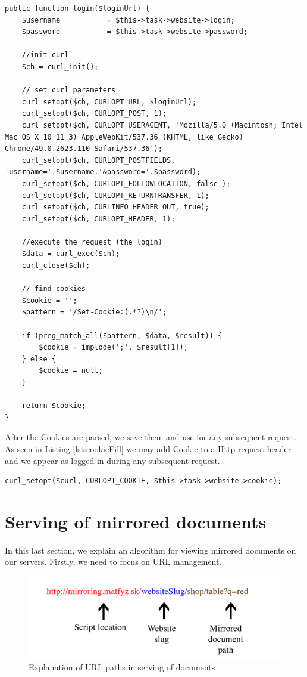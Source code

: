 \begin{lstlisting}[caption={Retrieving of a Cookie with Curl library},label={lst:login}]
public function login($loginUrl) {
    $username           = $this->task->website->login;
    $password           = $this->task->website->password;

    //init curl
    $ch = curl_init();
	
	// set curl parameters
    curl_setopt($ch, CURLOPT_URL, $loginUrl);
    curl_setopt($ch, CURLOPT_POST, 1);
    curl_setopt($ch, CURLOPT_USERAGENT, 'Mozilla/5.0 (Macintosh; Intel Mac OS X 10_11_3) AppleWebKit/537.36 (KHTML, like Gecko) Chrome/49.0.2623.110 Safari/537.36');
    curl_setopt($ch, CURLOPT_POSTFIELDS, 'username='.$username.'&password='.$password);
    curl_setopt($ch, CURLOPT_FOLLOWLOCATION, false );
    curl_setopt($ch, CURLOPT_RETURNTRANSFER, 1);
    curl_setopt($ch, CURLINFO_HEADER_OUT, true);
    curl_setopt($ch, CURLOPT_HEADER, 1);

    //execute the request (the login)
    $data = curl_exec($ch);
    curl_close($ch);

    // find cookies
    $cookie = '';
    $pattern = '/Set-Cookie:(.*?)\n/';

    if (preg_match_all($pattern, $data, $result)) {
        $cookie = implode(';', $result[1]);
    } else {
        $cookie = null;
    }

    return $cookie;
}
\end{lstlisting}

After the Cookies are parsed, we save them and use for any subsequent request. As seen in Listing \ref{lst:cookieFill} we may add Cookie to a Http request header and we appear as logged in during any subsequent request.

\begin{lstlisting}[caption={Adding Cookie to HTTP header using Curl},label={lst:cookieFill}]
curl_setopt($curl, CURLOPT_COOKIE, $this->task->website->cookie);
\end{lstlisting}

\section{Serving of mirrored documents}
\label{sec:serving}
In this last section, we explain an algorithm for viewing mirrored documents on our servers. Firstly, we need to focus on URL management.

\begin{figure}[h]
    \centering
    \includegraphics[width=\textwidth]{images/urls.png}
    \caption{Explanation of URL paths in serving of documents}
    \label{fig:urls}
\end{figure}

